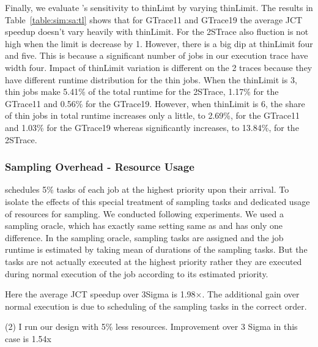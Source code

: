 Finally,
we evaluate \slearn's sensitivity to thinLimt by varying thinLimit. The results
in Table~\ref{table:sim:sa:tl} shows that for GTrace11 and GTrace19 the average
JCT speedup doesn't vary heavily with thinLimit. For the 2STrace also fluction
is not high when the limit is decrease by 1. However, there is a big dip at
thinLimit four and five.  This is because a significant number of jobs in our
execution trace have width four. Impact of thinLimit variation is different on
the 2 traces because they have different runtime distribution for the thin
jobs. When the thinLimit is 3, thin jobs make 5.41\% of the total runtime for
the 2STrace, 1.17\% for the GTrace11 and 0.56\% for the GTrace19. However, when
thinLimit is 6, the share of thin jobs in total runtime increases only a
little, to 2.69\%, for the GTrace11 and 1.03\% for the GTrace19 whereas
significantly increases, to 13.84\%, for the 2STrace.


\subsubsection{Sampling Overhead - Resource Usage}
\label{sec:sim:resource}

\slearn schedules 5\% tasks of each job at the highest priority upon their
arrival. To isolate the effects of this special treatment of sampling tasks and
dedicated usage of resources for sampling. We conducted following experiments.
We used a sampling oracle, which has exactly same setting same as \slearn and has
only one difference. In the sampling oracle, sampling tasks are assigned and
the job runtime is estimated by taking mean of durations of the sampling tasks.
But the tasks are not actually executed at the highest priority rather they are
executed during normal execution of the job according to its estimated priority.

Here the average JCT speedup over 3Sigma is 1.98$\times$. The additional gain
over normal execution is due to scheduling of the sampling tasks in the correct
order.

(2) I run our design with 5\% less resources. Improvement over 3 Sigma in this case is 1.54x


